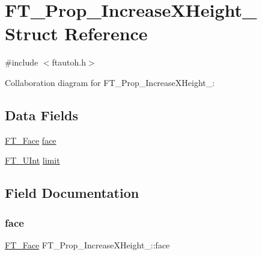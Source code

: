 \hypertarget{struct_f_t___prop___increase_x_height__}{}\section{F\+T\+\_\+\+Prop\+\_\+\+Increase\+X\+Height\+\_\+ Struct Reference}
\label{struct_f_t___prop___increase_x_height__}


{\ttfamily \#include $<$ftautoh.\+h$>$}



Collaboration diagram for F\+T\+\_\+\+Prop\+\_\+\+Increase\+X\+Height\+\_\+\+:
\subsection*{Data Fields}
\begin{DoxyCompactItemize}
\item 
\hyperlink{freetype_8h_a7eba045ee20968354fa1bff0f69740fa}{F\+T\+\_\+\+Face} \hyperlink{struct_f_t___prop___increase_x_height___ae761b2b7e3e086b3d672f16f5cc48643}{face}
\item 
\hyperlink{fttypes_8h_abcb8db4dbf35d2b55a9e8c7b0926dc52}{F\+T\+\_\+\+U\+Int} \hyperlink{struct_f_t___prop___increase_x_height___ae276b4241881f9e8ea57fd3a9e9c0d8a}{limit}
\end{DoxyCompactItemize}


\subsection{Field Documentation}
\mbox{\label{struct_f_t___prop___increase_x_height___ae761b2b7e3e086b3d672f16f5cc48643}} 
\subsubsection{\texorpdfstring{face}{face}}
{\footnotesize\ttfamily \hyperlink{freetype_8h_a7eba045ee20968354fa1bff0f69740fa}{F\+T\+\_\+\+Face} F\+T\+\_\+\+Prop\+\_\+\+Increase\+X\+Height\+\_\+\+::face}

\mbox{\label{struct_f_t___prop___increase_x_height___ae276b4241881f9e8ea57fd3a9e9c0d8a}} 
